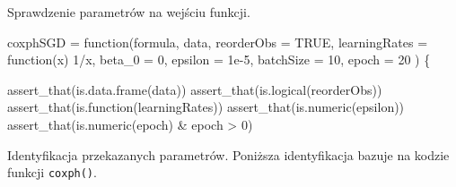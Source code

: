 \documentclass[]{article}
\newenvironment{Shaded}{}{}
\newcommand{\KeywordTok}[1]{\textcolor[rgb]{0.00,0.00,1.00}{{#1}}}
\newcommand{\DataTypeTok}[1]{{#1}}
\newcommand{\DecValTok}[1]{{#1}}
\newcommand{\FloatTok}[1]{{#1}}
\newcommand{\StringTok}[1]{\textcolor[rgb]{0.00,0.50,0.50}{{#1}}}
\newcommand{\OtherTok}[1]{\textcolor[rgb]{1.00,0.25,0.00}{{#1}}}
\newcommand{\NormalTok}[1]{{#1}}
\begin{document}
Sprawdzenie parametrów na wejściu funkcji.

\begin{Shaded}
\begin{Highlighting}[]
\NormalTok{coxphSGD =}\StringTok{ }\NormalTok{function(formula, data, }\DataTypeTok{reorderObs =} \OtherTok{TRUE}\NormalTok{,}
                    \DataTypeTok{learningRates =} \NormalTok{function(x) }\DecValTok{1}\NormalTok{/x,}
                    \DataTypeTok{beta_0 =} \DecValTok{0}\NormalTok{, }\DataTypeTok{epsilon =} \FloatTok{1e-5}\NormalTok{,}
                    \DataTypeTok{batchSize =} \DecValTok{10}\NormalTok{, }\DataTypeTok{epoch =} \DecValTok{20} \NormalTok{) \{}
  
  \KeywordTok{assert_that}\NormalTok{(}\KeywordTok{is.data.frame}\NormalTok{(data))}
  \KeywordTok{assert_that}\NormalTok{(}\KeywordTok{is.logical}\NormalTok{(reorderObs))}
  \KeywordTok{assert_that}\NormalTok{(}\KeywordTok{is.function}\NormalTok{(learningRates))}
  \KeywordTok{assert_that}\NormalTok{(}\KeywordTok{is.numeric}\NormalTok{(epsilon))}
  \KeywordTok{assert_that}\NormalTok{(}\KeywordTok{is.numeric}\NormalTok{(epoch) &}\StringTok{ }\NormalTok{epoch >}\StringTok{ }\DecValTok{0}\NormalTok{)}
\end{Highlighting}
\end{Shaded}

Identyfikacja przekazanych parametrów. Poniższa identyfikacja bazuje na
kodzie funkcji \texttt{coxph()}.
\end{document}
